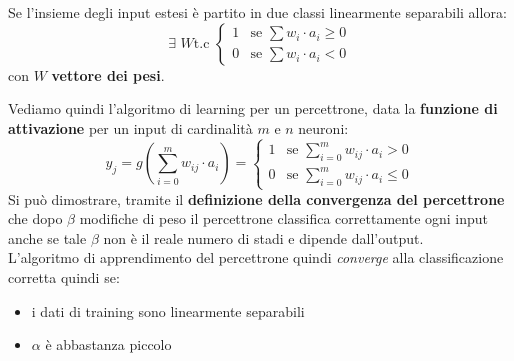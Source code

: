 \begin{definizione}
	Se l'insieme degli input estesi è partito in due classi linearmente separabili
	allora:
	\[\exists\,\, W\mbox{t.c }
		\begin{cases}
			1 & \mbox{se } \sum w_i\cdot a_i \geq 0 \\
			0 & \mbox{se } \sum w_i\cdot a_i < 0    
		\end{cases}
	\]
	con $W$ \textbf{vettore dei pesi}.
\end{definizione}
Vediamo quindi l'algoritmo di learning per un percettrone, data la
\textbf{funzione di attivazione} per un input di cardinalità $m$ e $n$ neuroni:
\[
	y_j=g\left(\sum_{i=0}^m w_{ij}\cdot a_i \right)=
	\begin{cases}
		1 & \mbox{se } \sum_{i=0}^m w_{ij}\cdot a_i > 0    \\
		0 & \mbox{se } \sum_{i=0}^m w_{ij}\cdot a_i \leq 0 
	\end{cases}
\]
Si può dimostrare, tramite il \textbf{definizione della convergenza del percettrone}
che dopo $\beta$ modifiche di peso il percettrone classifica 
correttamente ogni input anche se tale $\beta$ non è il reale numero di stadi e
dipende dall'output.\\
L'algoritmo di apprendimento del percettrone quindi \textit{converge} alla
classificazione corretta quindi se:
\begin{itemize}
	\item i dati di training sono linearmente separabili
	\item $\alpha$ è abbastanza piccolo
\end{itemize}
	
